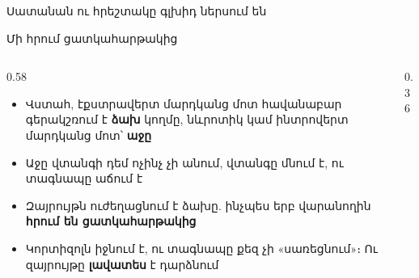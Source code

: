 \begin{frame}{Սատանան ու հրեշտակը գլխիդ ներսում են}
  \centering
  \par\smallskip
\end{frame}

\begin{frame}{Մի հրում ցատկահարթակից}
  \begin{columns}[c]
    \begin{column}{0.58\textwidth}
      \begin{itemize}
        \item Վստահ, էքստրավերտ մարդկանց մոտ հավանաբար գերակշռում է \textbf{ձախ} կողմը, նևրոտիկ կամ ինտրովերտ մարդկանց մոտ՝ \textbf{աջը}
        \item<2-> Աջը վտանգի դեմ ոչինչ չի անում, վտանգը մնում է, ու տագնապը աճում է
        \item<3-> Զայրույթն ուժեղացնում է ձախը. ինչպես երբ վարանողին \textbf{հրում են ցատկահարթակից}
        \item<4-> Կորտիզոլն իջնում է, ու տագնապը քեզ չի «սառեցնում»։ Ու զայրույթը \textbf{լավատես} է դարձնում
      \end{itemize}
    \end{column}
    \begin{column}{0.36\textwidth}
      \centering
      \par\medskip
    \end{column}
  \end{columns}
\end{frame}

